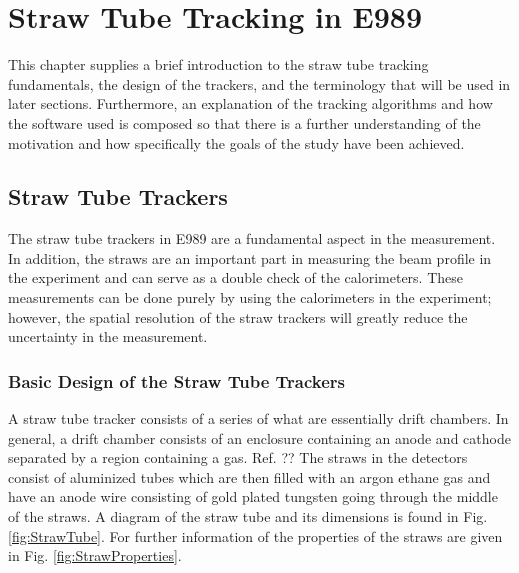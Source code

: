 \documentclass[./Thesis]{subfiles}
\begin{document}
\chapter{Straw Tube Tracking in E989}

This chapter supplies a brief introduction to the straw tube tracking fundamentals, the design of the trackers, and the terminology that will be used in later sections. Furthermore, an explanation of the tracking algorithms and how the software used is composed so that there is a further understanding of the motivation and how specifically the goals of the study have been achieved.

\section{Straw Tube Trackers}

The straw tube trackers in E989 are a fundamental aspect in the measurement.  In addition, the straws are an important part in measuring the beam profile in the experiment and can serve as a double check of the calorimeters.  These measurements can be done purely by using the calorimeters in the experiment; however, the spatial resolution of the straw trackers will greatly reduce the uncertainty in the measurement.

\subsection{Basic Design of the Straw Tube Trackers}

	A straw tube tracker consists of a series of what are essentially drift chambers.  In general, a drift chamber consists of an enclosure containing an anode and cathode separated by a region containing a gas.  Ref. \cite{aepps}?? The straws in the detectors consist of aluminized tubes which are then filled with an argon ethane gas and have an anode wire consisting of gold plated tungsten going through the middle of the straws.  A diagram of the straw tube and its dimensions is found in Fig.\ref{fig:StrawTube}.  For further information of the properties of the straws are given in Fig. \ref{fig:StrawProperties}.
 
\end{document}
